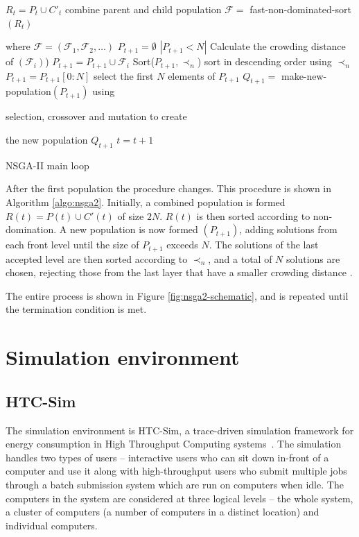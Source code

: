 \documentclass[10pt, conference, compsocconf]{IEEEtran}
\begin{document}
\begin{algorithm}[b]
\begin{algorithmic}[1]
\State $R_t=P_t \cup C'_t$ combine parent and child population
\State $\mathcal{F} = $ fast-non-dominated-sort $(R_t)$ 

where $\mathcal{F}=(\mathcal{F}_1, \mathcal{F}_2,\ldots)$
\State $P_{t+1}=\emptyset$
\While $\left|P_{t+1}<N\right|$
\State Calculate the crowding distance of $(\mathcal{F}_i)$)
\State $P_{t+1}=P_{t+1}\cup \mathcal{F}_i$
\EndWhile
\State Sort($P_{t+1}, \prec_n$) sort in descending order using $\prec_n$
\State $P_{t+1} = P_{t+1}[0:N]$ select the first $N$ elements of $P_{t+1}$
\State $Q_{t+1} = $ make-new-population$(P_{t+1})$ using 

selection, crossover and mutation to create 

the new population $Q_{t+1}$
\State $t=t+1$
\caption{NSGA-II main loop \cite{Valkanas2014}}
\label{algo:nsga2}
\end{algorithmic}
\end{algorithm}


After the first population the procedure changes. This procedure is shown in Algorithm \ref{algo:nsga2}. Initially, a combined population is formed $R(t)=P(t) \cup C'(t)$ of size $2N$. $R(t)$ is then sorted according to non-domination. A new population is now formed $(P_{t+1})$, adding solutions from each front level until the size of $P_{t+1}$ exceeds $N$. The solutions of the last accepted level are then sorted according to $\prec_n$, and a total of $N$ solutions are chosen, rejecting those from the last layer that have a smaller crowding distance \cite{Valkanas2014}.

The entire process is shown in Figure \ref{fig:nsga2-schematic}, and is repeated until the termination condition is met.



\section{Simulation environment}
\label{environment}

\subsection{HTC-Sim}
The simulation environment is HTC-Sim, a trace-driven simulation framework for energy consumption in High Throughput Computing systems~\cite{htc-sim}. The simulation handles two types of users -- interactive users who can sit down in-front of a computer and use it along with high-throughput users who submit multiple jobs through a batch submission system which are run on computers when idle. The computers in the system are considered at three logical levels -- the whole system, a cluster of computers (a number of computers in a distinct location) and individual computers.
\end{document}

